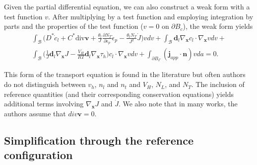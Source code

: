 \documentclass[10pt]{elsarticle}
\newcommand{\mbs}[1]{\boldsymbol{#1}}
\def\bs{{\mbs{s}}} \def\bt{{\mbs{t}}} \def\bu{{\mbs{u}}}
\def\bs{\boldsymbol}
\begin{document}
%
Given the partial differential equation, we can also construct a weak form with a test function $v$.  After multiplying by a test function and employing integration by parts and the properties of the test function ($v = 0$ on $\partial B_{c}$), the weak form yields
%
\begin{eqnarray}
\label{eq.weakform}  \int_{\mathcal{B}}  \bigg( D^{*}\dot{c}_{l} + C^{*}\text{div}\bs{v} + \frac{\theta_{l}}{J} \frac{\partial N_{T}}{\partial \epsilon_{p}} \dot{\epsilon}_{p} -  \frac{\theta_{t} N_{T}}{J^{2}}  \dot{J} \bigg)vdv + \int_{\mathcal{B}} \bs{d}_{l} \nabla_{\bs{x}}c_{l} \cdot  \nabla_{\bs{x}}vdv + \nonumber \\  \int_{\mathcal{B}} \bigg( \frac{1}{J} \bs{d}_{l} \nabla_{\bs{x}}J - \frac{V_{H}}{R T} \bs{d}_{l} \nabla_{\bs{x}}\tau_{h} \bigg)c_{l}   \cdot  \nabla_{\bs{x}}vdv + \int_{\partial B_{\Gamma}} (\bs{j}_{app} \cdot \bs{n}) v da = 0.
\end{eqnarray}

This form of the transport equation is found in the literature but often authors do not distinguish between $v_{h}$, $n_{l}$ and $n_{t}$ and $V_{H}$, $N_{L}$, and $N_{T}$. The inclusion of reference quantities (and their corresponding conservation equations) yields additional terms involving $\nabla_{\bs{x}}J$ and $\dot{J}$.  We also note that in many works, the authors assume that $div\bs{v} = 0$.  

\subsection{Simplification through the reference configuration}
 
\end{document}
